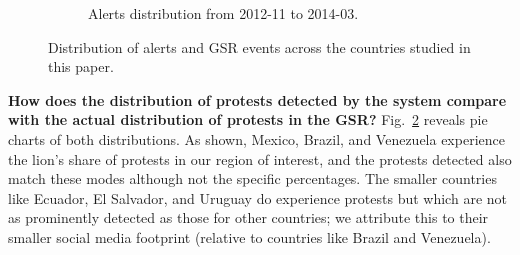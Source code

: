 \documentclass[letterpaper]{article}
\begin{document}
\begin{figure}
\begin{subfigure}{\columnwidth}
  \vspace{-2em}
  \caption{Alerts distribution from 2012-11 to 2014-03.}
  \label{fig:ppdistribution}
\end{subfigure}
  \vspace{-.5em}
\caption{Distribution of alerts and GSR events across the countries studied in this paper.}
\label{fig:distribution}
\end{figure}
\vspace{-1em}
\noindent
{\bf How does the distribution of protests detected by the system compare with the
actual distribution of protests in the GSR?}
Fig.~\ref{fig:distribution} reveals pie charts of both distributions. As shown, Mexico, Brazil, and Venezuela
experience the lion's share of protests in our region of interest, and the protests detected also match these modes
although not the specific percentages. The smaller countries like Ecuador, El Salvador, and Uruguay do experience
protests but which are not as prominently detected as those for other countries; we attribute this to their smaller
social media footprint (relative to countries like Brazil and Venezuela).\\
\end{document}
